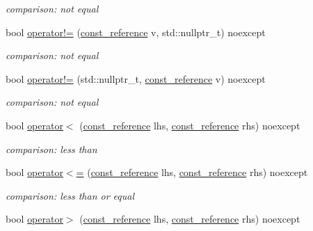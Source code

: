 \begin{DoxyCompactItemize}
\begin{DoxyCompactList}\small\item\em comparison\-: not equal \end{DoxyCompactList}\item 
bool \hyperlink{classnlohmann_1_1basic__json_ae347859ec88176ef76a0cbe5b4514fcf}{operator!=} (\hyperlink{classnlohmann_1_1basic__json_af677a29b0e66edc9f66e5167e4667071}{const\-\_\-reference} v, std\-::nullptr\-\_\-t) noexcept
\begin{DoxyCompactList}\small\item\em comparison\-: not equal \end{DoxyCompactList}\item 
bool \hyperlink{classnlohmann_1_1basic__json_a7f97a91ad8f1d5cf0b9213bd24f247c4}{operator!=} (std\-::nullptr\-\_\-t, \hyperlink{classnlohmann_1_1basic__json_af677a29b0e66edc9f66e5167e4667071}{const\-\_\-reference} v) noexcept
\begin{DoxyCompactList}\small\item\em comparison\-: not equal \end{DoxyCompactList}\item 
bool \hyperlink{classnlohmann_1_1basic__json_aacd442b66140c764c594ac8ad7dfd5b3}{operator$<$} (\hyperlink{classnlohmann_1_1basic__json_af677a29b0e66edc9f66e5167e4667071}{const\-\_\-reference} lhs, \hyperlink{classnlohmann_1_1basic__json_af677a29b0e66edc9f66e5167e4667071}{const\-\_\-reference} rhs) noexcept
\begin{DoxyCompactList}\small\item\em comparison\-: less than \end{DoxyCompactList}\item 
bool \hyperlink{classnlohmann_1_1basic__json_a5c8bb5200f5eac10d31e26be46e5b1ac}{operator$<$=} (\hyperlink{classnlohmann_1_1basic__json_af677a29b0e66edc9f66e5167e4667071}{const\-\_\-reference} lhs, \hyperlink{classnlohmann_1_1basic__json_af677a29b0e66edc9f66e5167e4667071}{const\-\_\-reference} rhs) noexcept
\begin{DoxyCompactList}\small\item\em comparison\-: less than or equal \end{DoxyCompactList}\item 
bool \hyperlink{classnlohmann_1_1basic__json_a87db51b6b936fb2ea293cdbc8702dcb8}{operator$>$} (\hyperlink{classnlohmann_1_1basic__json_af677a29b0e66edc9f66e5167e4667071}{const\-\_\-reference} lhs, \hyperlink{classnlohmann_1_1basic__json_af677a29b0e66edc9f66e5167e4667071}{const\-\_\-reference} rhs) noexcept

\end{DoxyCompactItemize}
